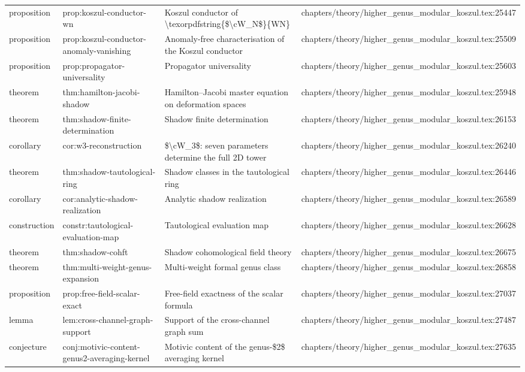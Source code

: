 \documentclass[11pt]{article}
\begin{document}
\begin{longtable}{L{0.10\textwidth}L{0.26\textwidth}L{0.42\textwidth}L{0.22\textwidth}}
proposition & prop:koszul-conductor-wn & Koszul conductor of \textbackslash{}texorpdfstring\{\$\textbackslash{}cW\_N\$\}\{WN\} & chapters/theory/higher\_genus\_modular\_koszul.tex:25447\\
proposition & prop:koszul-conductor-anomaly-vanishing & Anomaly-free characterisation of the Koszul conductor & chapters/theory/higher\_genus\_modular\_koszul.tex:25509\\
proposition & prop:propagator-universality & Propagator universality & chapters/theory/higher\_genus\_modular\_koszul.tex:25603\\
theorem & thm:hamilton-jacobi-shadow & Hamilton--Jacobi master equation on deformation spaces & chapters/theory/higher\_genus\_modular\_koszul.tex:25948\\
theorem & thm:shadow-finite-determination & Shadow finite determination & chapters/theory/higher\_genus\_modular\_koszul.tex:26153\\
corollary & cor:w3-reconstruction & \$\textbackslash{}cW\_3\$: seven parameters determine the full 2D tower & chapters/theory/higher\_genus\_modular\_koszul.tex:26240\\
theorem & thm:shadow-tautological-ring & Shadow classes in the tautological ring & chapters/theory/higher\_genus\_modular\_koszul.tex:26446\\
corollary & cor:analytic-shadow-realization & Analytic shadow realization & chapters/theory/higher\_genus\_modular\_koszul.tex:26589\\
construction & constr:tautological-evaluation-map & Tautological evaluation map & chapters/theory/higher\_genus\_modular\_koszul.tex:26628\\
theorem & thm:shadow-cohft & Shadow cohomological field theory & chapters/theory/higher\_genus\_modular\_koszul.tex:26675\\
theorem & thm:multi-weight-genus-expansion & Multi-weight formal genus class & chapters/theory/higher\_genus\_modular\_koszul.tex:26858\\
proposition & prop:free-field-scalar-exact & Free-field exactness of the scalar formula & chapters/theory/higher\_genus\_modular\_koszul.tex:27037\\
lemma & lem:cross-channel-graph-support & Support of the cross-channel graph sum & chapters/theory/higher\_genus\_modular\_koszul.tex:27487\\
conjecture & conj:motivic-content-genus2-averaging-kernel & Motivic content of the genus-\$2\$ averaging kernel & chapters/theory/higher\_genus\_modular\_koszul.tex:27635\\

\end{longtable}
\end{document}

